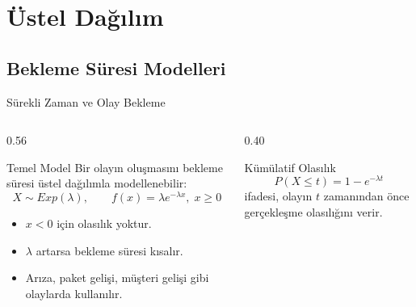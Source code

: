 \documentclass[light]{lutbeamer}
\begin{document}
\section{Üstel Dağılım}
\subsection{Bekleme Süresi Modelleri}

\begin{frame}{Sürekli Zaman ve Olay Bekleme}
\small
\begin{columns}[T,onlytextwidth]
    \begin{column}{0.56\textwidth}
        \begin{block}{Temel Model}
            Bir olayın oluşmasını bekleme süresi üstel dağılımla modellenebilir:
            \[
            X \sim Exp(\lambda), \qquad f(x)=\lambda e^{-\lambda x}, \; x \ge 0
            \]
        \end{block}

        \begin{itemize}
            \item $x<0$ için olasılık yoktur.
            \item $\lambda$ artarsa bekleme süresi kısalır.
            \item Arıza, paket gelişi, müşteri gelişi gibi olaylarda kullanılır.
        \end{itemize}
    \end{column}
    \begin{column}{0.40\textwidth}
        \begin{exampleblock}{Kümülatif Olasılık}
            \[
            P(X \le t)=1-e^{-\lambda t}
            \]
            ifadesi, olayın $t$ zamanından önce gerçekleşme olasılığını verir.
        \end{exampleblock}
    \end{column}
\end{columns}
\end{frame}
\end{document}

